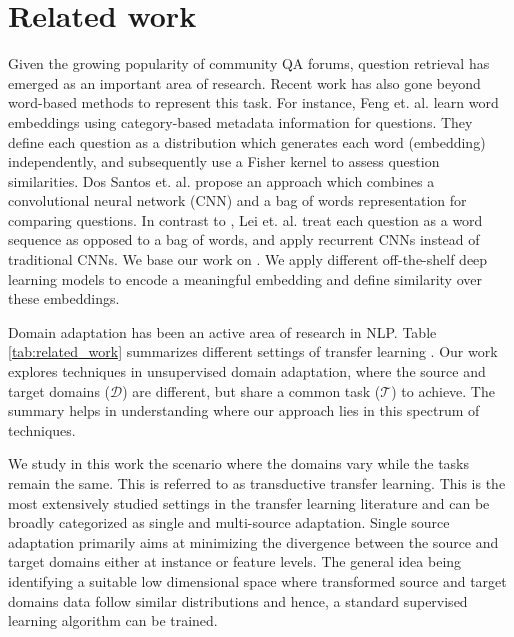 \documentclass{sigkddExp}
\begin{document}
\section{Related work}
\label{related}
Given the growing popularity of community QA forums, question retrieval has emerged as an important area of research. Recent work has also gone beyond word-based methods to represent this task. For instance, Feng et. al. \cite{feng2015applying} learn word embeddings using category-based metadata information for questions. They define each question as a distribution which generates each word (embedding) independently, and subsequently use a Fisher kernel to assess question similarities. Dos Santos et. al. \cite{dos2015learning} propose an approach which combines a convolutional neural network (CNN) and a bag of words representation for comparing questions. In contrast to \cite{feng2015applying}, Lei et. al. \cite{lei2015semi} treat each question as a word sequence as opposed to a bag of words, and apply recurrent CNNs instead of traditional CNNs. We base our work on \cite{lei2015semi}. We apply different off-the-shelf deep learning models to encode a meaningful embedding and define similarity over these embeddings.

Domain adaptation has been an active area of research in NLP. Table \ref{tab:related_work}  summarizes different settings of transfer learning \cite{pan2010survey}. Our work explores techniques in unsupervised domain adaptation, where the source and target domains ($\mathcal{D}$) are different, but share a common task ($\mathcal{T}$) to achieve. The summary helps in understanding where our approach lies in this spectrum of techniques.

We study in this work the scenario where the domains vary while the tasks remain the same. This is referred to as transductive transfer learning. This is the most extensively studied settings in the transfer learning literature and can be broadly categorized as single and multi-source adaptation. Single source adaptation\cite{chen2009extracting, ando2005framework, daume2009frustratingly} primarily aims at minimizing the divergence between the source and target domains either at instance or feature levels. The general idea being identifying a suitable low dimensional space where transformed source and target domains data follow similar distributions and hence, a standard supervised learning algorithm can be trained.
\end{document}
